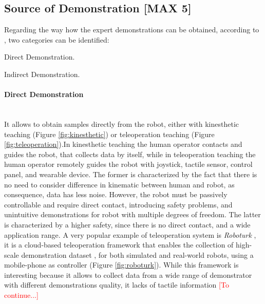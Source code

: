 \subsection{Source of Demonstration [MAX 5]}
\label{sec:source_of_demonstration}
Regarding the way how the expert demonstrations can be obtained, according to \cite{fang2019survey}, two categories can be identified: \begin{enumerate*}[label=\textbf{(\alph*)}]
    \item Direct Demonstration. 
    \item Indirect Demonstration.
\end{enumerate*}

\paragraph{Direct Demonstration}  \mbox{} \\
It allows to obtain samples directly from the robot, either with kinesthetic teaching (Figure \ref{fig:kinesthetic}) or teleoperation teaching (Figure \ref{fig:teleoperation}).In kinesthetic teaching the human operator contacts and guides the robot, that collects data by itself, while in teleoperation teaching the human operator remotely guides the robot with joystick, tactile sensor, control panel, and wearable device. 
The former is characterized by the fact that there is no need to consider difference in kinematic between human and robot, as consequence, data has less noise. However, the robot must be passively controllable and require direct contact, introducing safety problems, and unintuitive demonstrations for robot with multiple degrees of freedom.
The latter is characterized by a higher safety, since there is no direct contact, and a wide application range.
A very popular example of teleoperation system is \textit{Roboturk} \cite{mandlekar2018roboturk}, it is a cloud-based teleoperation framework that enables the collection of high-scale demonstration dataset \cite{mandlekar2019scaling,mandlekar2022matters}, for both simulated and real-world robots, using a mobile-phone as controller (Figure \ref{fig:roboturk}). 
While this framework is interesting because it allows to collect data from a wide range of demonstrator with different demonstrations quality, it lacks of tactile information \textcolor{red}{[To continue...]}


